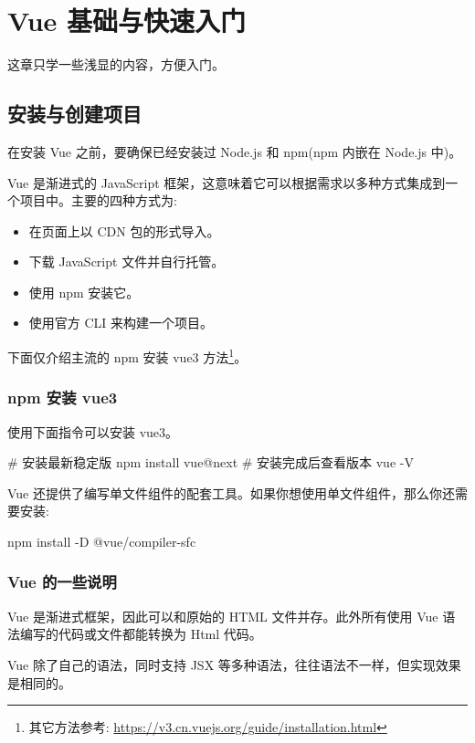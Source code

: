 \chapter{Vue 基础与快速入门}

这章只学一些浅显的内容，方便入门。

\section{安装与创建项目}
在安装 Vue 之前，要确保已经安装过 Node.js 和 npm(npm 内嵌在 Node.js 中)。

Vue 是渐进式的 JavaScript 框架，这意味着它可以根据需求以多种方式集成到一个项目中。主要的四种方式为:

\begin{itemize}
    \item 在页面上以 CDN 包的形式导入。
    \item 下载 JavaScript 文件并自行托管。
    \item 使用 npm 安装它。
    \item 使用官方 CLI 来构建一个项目。
\end{itemize}

下面仅介绍主流的 npm 安装 vue3 方法\footnote{其它方法参考: \url{https://v3.cn.vuejs.org/guide/installation.html}}。

\subsection{npm 安装 vue3}

使用下面指令可以安装 vue3。

\begin{bash}
# 安装最新稳定版
npm install vue@next
# 安装完成后查看版本
vue -V
\end{bash}

Vue 还提供了编写单文件组件的配套工具。如果你想使用单文件组件，那么你还需要安装:

\begin{bash}
npm install -D @vue/compiler-sfc
\end{bash}

\subsection{Vue 的一些说明}

Vue 是渐进式框架，因此可以和原始的 HTML 文件并存。此外所有使用 Vue 语法编写的代码或文件都能转换为 Html 代码。

Vue 除了自己的语法，同时支持 JSX 等多种语法，往往语法不一样，但实现效果是相同的。

